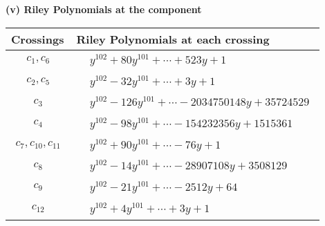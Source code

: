 \documentclass[1p]{elsarticle_modified}
\theoremstyle{definition}
\begin{document}
\newpage\renewcommand{\arraystretch}{1}
\flushleft \textbf{(v) Riley Polynomials at the component}\newline \\
\begin{tabular}{m{50pt}|m{274pt}}
Crossings & \hspace{64pt}Riley Polynomials at each crossing \\
\hline $$\begin{aligned}c_{1},c_{6}\end{aligned}$$&$\begin{aligned}
&y^{102}+80 y^{101}+\cdots+523 y+1
\end{aligned}$\\
\hline $$\begin{aligned}c_{2},c_{5}\end{aligned}$$&$\begin{aligned}
&y^{102}-32 y^{101}+\cdots+3 y+1
\end{aligned}$\\
\hline $$\begin{aligned}c_{3}\end{aligned}$$&$\begin{aligned}
&y^{102}-126 y^{101}+\cdots-2034750148 y+35724529
\end{aligned}$\\
\hline $$\begin{aligned}c_{4}\end{aligned}$$&$\begin{aligned}
&y^{102}-98 y^{101}+\cdots-154232356 y+1515361
\end{aligned}$\\
\hline $$\begin{aligned}c_{7},c_{10},c_{11}\end{aligned}$$&$\begin{aligned}
&y^{102}+90 y^{101}+\cdots-76 y+1
\end{aligned}$\\
\hline $$\begin{aligned}c_{8}\end{aligned}$$&$\begin{aligned}
&y^{102}-14 y^{101}+\cdots-28907108 y+3508129
\end{aligned}$\\
\hline $$\begin{aligned}c_{9}\end{aligned}$$&$\begin{aligned}
&y^{102}-21 y^{101}+\cdots-2512 y+64
\end{aligned}$\\
\hline $$\begin{aligned}c_{12}\end{aligned}$$&$\begin{aligned}
&y^{102}+4 y^{101}+\cdots+3 y+1
\end{aligned}$\\
\hline
\end{tabular}\\~\\
\end{document}
